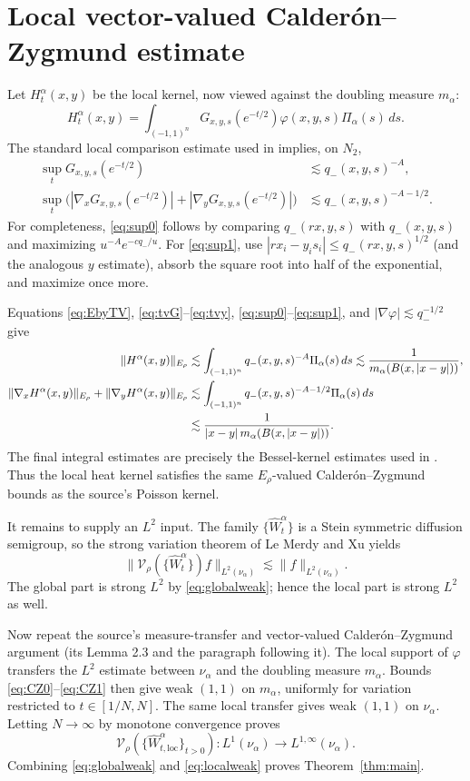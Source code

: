 \documentclass[11pt]{article}
\newcommand{\V}{\mathcal V}
\newcommand{\W}{\widehat W}
\newcommand{\nuA}{\nu_\alpha}
\newcommand{\dmA}{m_\alpha}
\begin{document}
\section{Local vector-valued Calder\'on--Zygmund estimate}

Let $H_t^\alpha(x,y)$ be the local kernel, now viewed against the doubling
measure $\dmA$:
\[
 H_t^\alpha(x,y)=\int_{(-1,1)^n}
 G_{x,y,s}(e^{-t/2})\varphi(x,y,s)\Pi_\alpha(s)\,ds.
\]
The standard local comparison estimate used in \cite[Lemma 2.2]{source}
implies, on $N_2$,
\begin{align}
 \sup_tG_{x,y,s}(e^{-t/2})&\lesssim q_-(x,y,s)^{-A},\label{eq:sup0}\\
 \sup_t\big(|\nabla_xG_{x,y,s}(e^{-t/2})|+
 |\nabla_yG_{x,y,s}(e^{-t/2})|\big)
 &\lesssim q_-(x,y,s)^{-A-1/2}.\label{eq:sup1}
\end{align}
For completeness, \eqref{eq:sup0} follows by comparing
$q_-(rx,y,s)$ with $q_-(x,y,s)$ and maximizing
$u^{-A}e^{-cq_-/u}$.  For \eqref{eq:sup1}, use
$|rx_i-y_is_i|\leq q_-(rx,y,s)^{1/2}$ (and the analogous $y$ estimate),
absorb the square root into half of the exponential, and maximize once more.

Equations \eqref{eq:EbyTV}, \eqref{eq:tvG}--\eqref{eq:tvy},
\eqref{eq:sup0}--\eqref{eq:sup1}, and
$|\nabla\varphi|\lesssim q_-^{-1/2}$ give
\begin{align}
 \|H^\alpha(x,y)\|_{E_\rho}
 &\lesssim \int_{(-1,1)^n}q_-(x,y,s)^{-A}\Pi_\alpha(s)\,ds
 \lesssim \frac1{\dmA(B(x,|x-y|))},\label{eq:CZ0}\\
 \|\nabla_xH^\alpha(x,y)\|_{E_\rho}+
 \|\nabla_yH^\alpha(x,y)\|_{E_\rho}
 &\lesssim \int_{(-1,1)^n}q_-(x,y,s)^{-A-1/2}\Pi_\alpha(s)\,ds\notag\\
 &\lesssim\frac1{|x-y|\,\dmA(B(x,|x-y|))}.\label{eq:CZ1}
\end{align}
The final integral estimates are precisely the Bessel-kernel estimates used in
\cite[Lemma 2.2]{source}.  Thus the local heat kernel satisfies the same
$E_\rho$-valued Calder\'on--Zygmund bounds as the source's Poisson kernel.

It remains to supply an $L^2$ input.  The family $\{\W_t^\alpha\}$ is a Stein
symmetric diffusion semigroup, so the strong variation theorem of Le Merdy and
Xu \cite[Corollary 6.1]{lemx} yields
\[
 \|\V_\rho(\{\W_t^\alpha\})f\|_{L^2(\nuA)}\lesssim\|f\|_{L^2(\nuA)}.
\]
The global part is strong $L^2$ by \eqref{eq:globalweak}; hence the local part
is strong $L^2$ as well.

Now repeat the source's measure-transfer and vector-valued
Calder\'on--Zygmund argument (its Lemma 2.3 and the paragraph following it).
The local support of $\varphi$ transfers the $L^2$ estimate between $\nuA$ and
the doubling measure $\dmA$.  Bounds \eqref{eq:CZ0}--\eqref{eq:CZ1} then give
weak $(1,1)$ on $\dmA$, uniformly for variation restricted to
$t\in[1/N,N]$.  The same local transfer gives weak $(1,1)$ on $\nuA$.
Letting $N\to\infty$ by monotone convergence proves
\begin{equation}\label{eq:localweak}
 \V_\rho(\{\W_{t,\mathrm{loc}}^\alpha\}_{t>0}):
 L^1(\nuA)\longrightarrow L^{1,\infty}(\nuA).
\end{equation}
Combining \eqref{eq:globalweak} and \eqref{eq:localweak} proves
Theorem~\ref{thm:main}.
\end{document}
